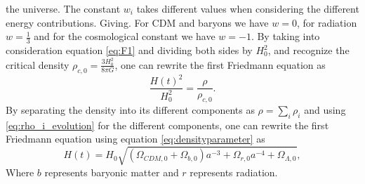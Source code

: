 the universe. The constant $w_i$ takes different values when considering the
different energy contributions. Giving. For CDM and baryons we have $w=0$, for
radiation $w=\frac{1}{3}$ and for the cosmological constant we have $w=-1$. By
taking into consideration equation \ref{eq:F1} and dividing both sides by $H_0^2$,
and recognize the critical density $\rho_{c,0}=\frac{3H_0^2}{8\pi G}$, one can
rewrite the first Friedmann equation as
\begin{equation}
    \frac{H(t)^2}{H_0^2}=\frac{\rho}{\rho_{c,0}}.
\end{equation}
By separating the density into its different components as $\rho=\sum_i\rho_i$
and using \ref{eq:rho_i_evolution} for the different components, one can rewrite
the first Friedmann equation using equation \ref{eq:densityparameter} as
\begin{equation}
    H(t)=H_0\sqrt{(\Omega_{CDM,0} + \Omega_{b,0})a^{-3} + \Omega_{r,0}a^{-4} + \Omega_{\Lambda,0}},
\end{equation}
Where $b$ represents baryonic matter and $r$ represents radiation.


